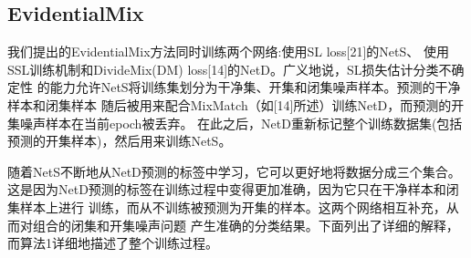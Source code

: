 \documentclass[12pt]{article}
\begin{document}
\subsection{EvidentialMix}
我们提出的EvidentialMix方法同时训练两个网络:使用SL loss[21]的NetS、
使用SSL训练机制和DivideMix(DM) loss[14]的NetD。广义地说，SL损失估计分类不确定性
的能力允许NetS将训练集划分为干净集、开集和闭集噪声样本。预测的干净样本和闭集样本
随后被用来配合MixMatch（如[14]所述）训练NetD，而预测的开集噪声样本在当前epoch被丢弃。
在此之后，NetD重新标记整个训练数据集(包括预测的开集样本)，然后用来训练NetS。

随着NetS不断地从NetD预测的标签中学习，它可以更好地将数据分成三个集合。
这是因为NetD预测的标签在训练过程中变得更加准确，因为它只在干净样本和闭集样本上进行
训练，而从不训练被预测为开集的样本。这两个网络相互补充，从而对组合的闭集和开集噪声问题
产生准确的分类结果。下面列出了详细的解释，而算法1详细地描述了整个训练过程。
\end{document}

